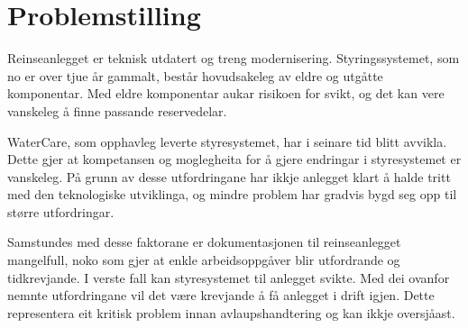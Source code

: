 \section{Problemstilling}
Reinseanlegget er teknisk utdatert og treng modernisering. Styringssystemet, som no er over tjue år gammalt,
består hovudsakeleg av eldre og utgåtte komponentar. Med eldre komponentar aukar risikoen for svikt, 
og det kan vere vanskeleg å finne passande reservedelar.

WaterCare, som opphavleg leverte styresystemet, har i seinare tid blitt avvikla. Dette gjer at kompetansen 
og moglegheita for å gjere endringar i styresystemet er vanskeleg. 
På grunn av desse utfordringane har ikkje anlegget klart å halde tritt med den teknologiske utviklinga, 
og mindre problem har gradvis bygd seg opp til større utfordringar.

Samstundes med desse faktorane er dokumentasjonen til reinseanlegget mangelfull, noko som gjer at enkle arbeidsoppgåver blir utfordrande og tidkrevjande.
I verste fall kan styresystemet til anlegget svikte. Med dei ovanfor nemnte utfordringane vil det være krevjande
å få anlegget i drift igjen. Dette representera eit kritisk problem innan avlaupshandtering og kan ikkje oversjåast.
\newline





